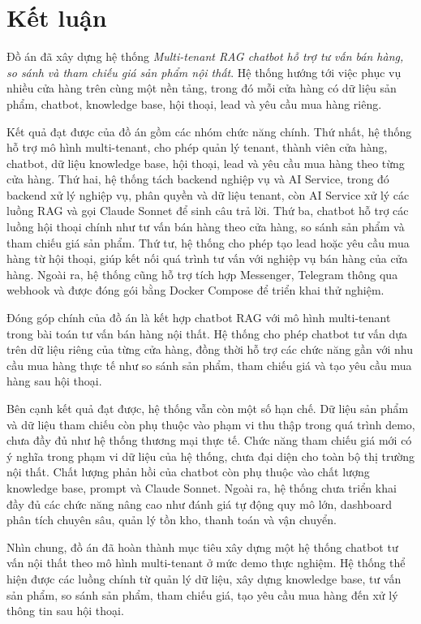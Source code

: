 \documentclass[../DoAn.tex]{subfiles}
\begin{document}
\section{Kết luận}

Đồ án đã xây dựng hệ thống \textit{Multi-tenant RAG chatbot hỗ trợ tư vấn bán hàng, so sánh và tham chiếu giá sản phẩm nội thất}. Hệ thống hướng tới việc phục vụ nhiều cửa hàng trên cùng một nền tảng, trong đó mỗi cửa hàng có dữ liệu sản phẩm, chatbot, knowledge base, hội thoại, lead và yêu cầu mua hàng riêng.

Kết quả đạt được của đồ án gồm các nhóm chức năng chính. Thứ nhất, hệ thống hỗ trợ mô hình multi-tenant, cho phép quản lý tenant, thành viên cửa hàng, chatbot, dữ liệu knowledge base, hội thoại, lead và yêu cầu mua hàng theo từng cửa hàng. Thứ hai, hệ thống tách backend nghiệp vụ và AI Service, trong đó backend xử lý nghiệp vụ, phân quyền và dữ liệu tenant, còn AI Service xử lý các luồng RAG và gọi Claude Sonnet để sinh câu trả lời. Thứ ba, chatbot hỗ trợ các luồng hội thoại chính như tư vấn bán hàng theo cửa hàng, so sánh sản phẩm và tham chiếu giá sản phẩm. Thứ tư, hệ thống cho phép tạo lead hoặc yêu cầu mua hàng từ hội thoại, giúp kết nối quá trình tư vấn với nghiệp vụ bán hàng của cửa hàng. Ngoài ra, hệ thống cũng hỗ trợ tích hợp Messenger, Telegram thông qua webhook và được đóng gói bằng Docker Compose để triển khai thử nghiệm.

Đóng góp chính của đồ án là kết hợp chatbot RAG với mô hình multi-tenant trong bài toán tư vấn bán hàng nội thất. Hệ thống cho phép chatbot tư vấn dựa trên dữ liệu riêng của từng cửa hàng, đồng thời hỗ trợ các chức năng gần với nhu cầu mua hàng thực tế như so sánh sản phẩm, tham chiếu giá và tạo yêu cầu mua hàng sau hội thoại.

Bên cạnh kết quả đạt được, hệ thống vẫn còn một số hạn chế. Dữ liệu sản phẩm và dữ liệu tham chiếu còn phụ thuộc vào phạm vi thu thập trong quá trình demo, chưa đầy đủ như hệ thống thương mại thực tế. Chức năng tham chiếu giá mới có ý nghĩa trong phạm vi dữ liệu của hệ thống, chưa đại diện cho toàn bộ thị trường nội thất. Chất lượng phản hồi của chatbot còn phụ thuộc vào chất lượng knowledge base, prompt và Claude Sonnet. Ngoài ra, hệ thống chưa triển khai đầy đủ các chức năng nâng cao như đánh giá tự động quy mô lớn, dashboard phân tích chuyên sâu, quản lý tồn kho, thanh toán và vận chuyển.

Nhìn chung, đồ án đã hoàn thành mục tiêu xây dựng một hệ thống chatbot tư vấn nội thất theo mô hình multi-tenant ở mức demo thực nghiệm. Hệ thống thể hiện được các luồng chính từ quản lý dữ liệu, xây dựng knowledge base, tư vấn sản phẩm, so sánh sản phẩm, tham chiếu giá, tạo yêu cầu mua hàng đến xử lý thông tin sau hội thoại.
\end{document}
